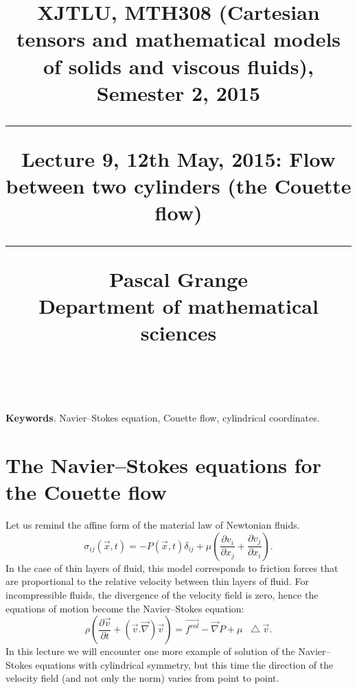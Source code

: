 \documentclass[DIV=12]{article}
\newcommand*\Laplace{\mathop{}\!\mathbin\bigtriangleup}
\newcommand{\fVol}{\vec{f^{vol}}}
\begin{document}
\title{
\noindent\hrulefill
\begin{flushleft}
{\Large \bf{XJTLU, MTH308 (Cartesian tensors and mathematical models of solids and viscous fluids), Semester 2, 2015\\
\vspace{8mm}
\hrule
\vspace{6mm}
 Lecture 9, 12th May, 2015: Flow between two cylinders (the Couette flow)}}
\vspace{8mm}
\hrule
\vspace{6mm}
{\Large{Pascal Grange\\
Department of mathematical sciences\\
{}\\
}}
\noindent\hrulefill
\end{flushleft}}
\date{}
\author{}
\maketitle
\vspace{-9mm}
 
{\bf{Keywords}}. Navier--Stokes equation, Couette flow, cylindrical coordinates.\\
\vspace{3mm}

\tableofcontents 

\vspace{8mm}





\section{The Navier--Stokes equations for the Couette flow}

Let us remind the affine form of the material law of Newtonian fluids.
\begin{equation}
\sigma_{ij}( \vec{x}, t ) = -P(\vec{x}, t ) \delta_{ij}+ \mu\left( \frac{\partial v_i}{\partial x_j} + \frac{\partial v_j}{\partial x_i}\right).
 \label{sigmaNewton}
\end{equation}
 In the case of thin layers of fluid, this model corresponds to friction forces that are proportional to the relative velocity 
 between thin layers of fluid. For incompressible fluids, the divergence of the velocity field is zero, hence the 
 equations of motion become the Navier--Stokes equation:
 \begin{equation}
 \rho\left( \frac{\partial \vec{v}}{\partial t} + ( \vec{v}.\vec{\nabla}) \vec{v}\right)= \fVol - \vec{\nabla} P + \mu \Laplace \vec{v}.
\label{NS}
 \end{equation}
In this lecture we will encounter one more example of solution of the Navier--Stokes 
 equations with cylindrical symmetry, but this time the direction of the velocity field (and not only the 
 norm) varies from point to point.
\end{document}
